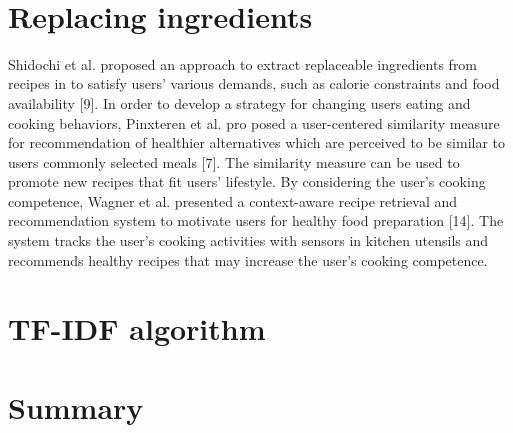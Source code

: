 ~\cite{Kuo:2012:IMP:2390776.2390778}

\section{Replacing ingredients}

Shidochi et al. proposed an approach to extract replaceable
ingredients from recipes in to satisfy users' various demands, such as calorie constraints and food availability [9]. In order to develop a strategy for changing users eating and cooking behaviors, Pinxteren et al. pro
posed a user-centered similarity measure for recommendation of healthier alternatives which are perceived to be similar to users commonly selected meals [7]. The similarity measure can be used to promote new recipes that fit
users’ lifestyle. By considering the user’s cooking competence, Wagner et al. presented a context-aware recipe retrieval and recommendation system to motivate users for healthy food preparation [14]. The system tracks the user’s cooking activities with sensors in kitchen utensils and recommends healthy recipes that may increase the user’s cooking competence.

\section{TF-IDF algorithm}

\section{Summary}
